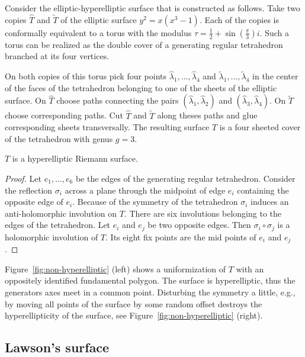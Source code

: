 \documentclass[Thesis]{subfiles}
\begin{document}
Consider the elliptic-hyperelliptic surface that is constructed as follows. Take two copies $\hat T$ and $\tilde T$ of the elliptic surface $y^2=x(x^3 - 1)$. Each of the copies is conformally equivalent to a torus with the modulus $\tau=\frac{1}{2}+\sin(\frac{\pi}{3})i$. Such a torus can be realized as the double cover of a generating regular tetrahedron branched at its four vertices.

On both copies of this torus pick four points $\hat\lambda_1,\ldots,\hat\lambda_4$ and $\tilde\lambda_1,\ldots,\tilde\lambda_4$ in the center of the faces of the tetrahedron belonging to one of the sheets of the elliptic surface. On $\hat T$ choose paths connecting the pairs $(\hat\lambda_1,\hat\lambda_2)$ and $(\hat\lambda_3,\hat\lambda_4)$. On $\tilde T$ choose corresponding paths. Cut $\hat T$ and $\tilde T$ along theses paths and glue corresponding sheets transversally. The resulting surface $T$ is a four sheeted cover of the tetrahedron with genus $g = 3$.

\begin{theorem}
$T$ is a hyperelliptic Riemann surface.
\end{theorem}

\begin{proof}
Let $e_1,\ldots,e_6$ be the edges of the generating regular tetrahedron. Consider the reflection $\sigma_i$ across a plane through the midpoint of edge $e_i$ containing the opposite edge of $e_i$.  Because of the symmetry of the tetrahedron $\sigma_i$ induces an anti-holomorphic involution on $T$. There are six involutions belonging to the edges of the tetrahedron. Let $e_i$ and $e_j$ be two opposite edges. Then $\sigma_i \circ \sigma_j$ is a holomorphic involution of $T$. Its eight fix points are the mid points of $e_i$ and $e_j$.
\end{proof}

Figure~\ref{fig:non-hyperelliptic} (left) shows a uniformization of $T$ with an oppositely identified fundamental polygon. The surface is hyperelliptic, thus the generators axes meet in a common point. Disturbing the symmetry a little, e.g., by moving all points of the surface by some random offset destroys the hyperellipticity of the surface, see Figure~\ref{fig:non-hyperelliptic} (right).

\subsection{Lawson's surface}
\label{sec:lawson_uniformization}
\end{document}
